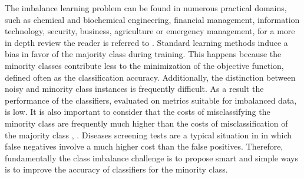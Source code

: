 \documentclass[parskip=full]{scrartcl}
\begin{document}
The imbalance learning problem can be found in numerous practical domains, such
as chemical and biochemical engineering, financial management, information
technology, security, business, agriculture or emergency management, for a more
in depth review the reader is referred to \cite{Haixiang2017}. Standard
learning methods induce a bias in favor of the majority class during training.
This happens because the minority classes contribute less to the minimization of
the objective function, defined often as the classification accuracy.
Additionally, the distinction between noisy and minority class instances is
frequently difficult. As a result the performance of the classifiers, evaluated
on metrics suitable for imbalanced data, is low. It is also important to
consider that the costs of misclassifying the minority class are frequently much
higher than the costs of misclassification of the majority class
\cite{Domingos1999}, \cite{Ting2002}. Diseases screening tests are a typical
situation in in which false negatives involve a much higher cost than the false
positives. Therefore, fundamentally the class imbalance challenge is to propose
smart and simple ways is to improve the accuracy of classifiers for the minority
class.



\end{document}
